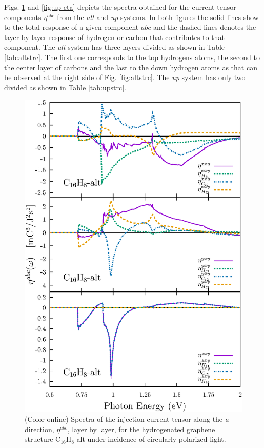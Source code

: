 \documentclass[pss]{wiley2sp} %
\begin{document}
Figs. \ref{fig:alt-eta} and \ref{fig:up-eta} depicts the spectra obtained for the current tensor components $\eta^{abc}$ from the \emph{alt} and \emph{up} systems. In both figures the solid lines show to the total response of a given component $abc$ and the dashed lines denotes the layer by layer response of hydrogen or carbon that contributes to that component. The \emph{alt} system has three layers divided as shown in Table \ref{tab:altstrc}. The first one corresponds to the top hydrogens atoms, the second to the center layer of carbons and the last to the down hydrogen atoms as that can be observed at the right side of Fig. \ref{fig:altstrc}. The \emph{up} system has only two divided as shown in Table \ref{tab:upstrc}.
\begin{figure}[t]
  \centering
  \includegraphics[width=\linewidth]{alt/alt-eta-layers.eps}
  \caption{(Color online) Spectra of the injection current tensor along the \emph{a} direction, {$\eta^{abc}$}, layer by layer, for the hydrogenated graphene structure C$_{16}$H$_{8}$-alt under incidence of circularly polarized light.\label{fig:alt-eta}}
\end{figure}
\end{document}
